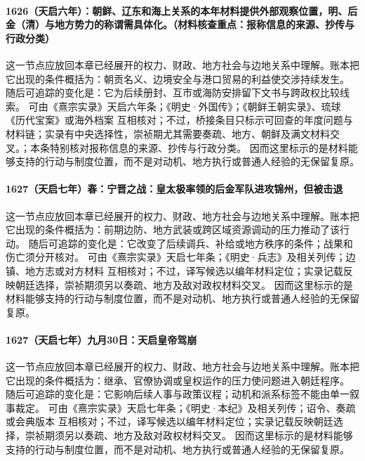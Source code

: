 \paragraph{1626（天启六年）：朝鲜、辽东和海上关系的本年材料提供外部观察位置，明、后金（清）与地方势力的称谓需具体化。（材料核查重点：报称信息的来源、抄传与行政分类）} 这一节点应放回本章已经展开的权力、财政、地方社会与边地关系中理解。账本把它出现的条件概括为：朝贡名义、边境安全与港口贸易的利益使交涉持续发生。 随后可追踪的变化是：它为后续册封、互市或海防安排留下文书与跨政权比较线索。 可由《熹宗实录》天启六年条；《明史·外国传》；《朝鲜王朝实录》、琉球《历代宝案》或海外档案 互相核对；不过，桥接条目只标示可回查的年度问题与材料链；实录有中央选择性，崇祯期尤其需要奏疏、地方、朝鲜及满文材料交叉。；本条特别核对报称信息的来源、抄传与行政分类。 因而这里标示的是材料能够支持的行动与制度位置，而不是对动机、地方执行或普通人经验的无保留复原。

\paragraph{1627（天启七年）春：宁晋之战：皇太极率领的后金军队进攻锦州，但被击退} 这一节点应放回本章已经展开的权力、财政、地方社会与边地关系中理解。账本把它出现的条件概括为：前期边防、地方武装或跨区域资源调动的压力推动了该行动。 随后可追踪的变化是：它改变了后续调兵、补给或地方秩序的条件；战果和伤亡须分开核对。 可由《熹宗实录》天启七年条；《明史·兵志》及相关列传；边镇、地方志或对方材料 互相核对；不过，译写候选以编年材料定位；实录记载反映朝廷选择，崇祯期须另以奏疏、地方及敌对政权材料交叉。 因而这里标示的是材料能够支持的行动与制度位置，而不是对动机、地方执行或普通人经验的无保留复原。

\paragraph{1627（天启七年）九月30日：天启皇帝驾崩} 这一节点应放回本章已经展开的权力、财政、地方社会与边地关系中理解。账本把它出现的条件概括为：继承、官僚协调或皇权运作的压力使问题进入朝廷程序。 随后可追踪的变化是：它影响后续人事与政策议程；动机和派系标签不能由单一叙事裁定。 可由《熹宗实录》天启七年条；《明史·本纪》及相关列传；诏令、奏疏或会典版本 互相核对；不过，译写候选以编年材料定位；实录记载反映朝廷选择，崇祯期须另以奏疏、地方及敌对政权材料交叉。 因而这里标示的是材料能够支持的行动与制度位置，而不是对动机、地方执行或普通人经验的无保留复原。

